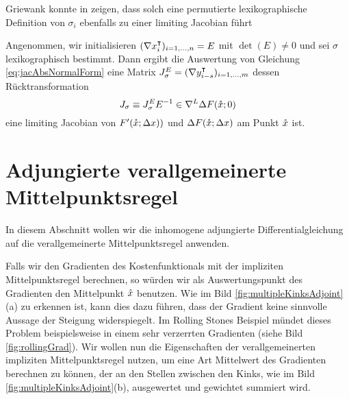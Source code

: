 Griewank konnte in \cite[Prop.8]{monster} zeigen, dass solch eine permutierte lexikographische Definition von $\sigma_i$ ebenfalls zu einer limiting Jacobian führt
\begin{theorem}
Angenommen, wir initialisieren $(\nabla x_i^\intercal)_{i=1,\ldots,n} = E$ mit $\det(E)\neq 0$ und sei $\sigma$ lexikographisch bestimmt. Dann ergibt die Auswertung von Gleichung \eqref{eq:jacAbsNormalForm} eine Matrix $J_\sigma^E = (\nabla y_{i-s}^\intercal)_{i=1,\ldots,m}$ dessen Rücktransformation
\[
 J_\sigma \equiv J_\sigma^E E^{-1} \in \nabla^L \Delta F(\mathring{x};0) 
\]
eine limiting Jacobian von $F'(\mathring{x};\Delta x))$ und $\Delta F(\mathring{x};\Delta x)$ am Punkt $\mathring{x}$ ist.
\end{theorem}
\section{Adjungierte verallgemeinerte Mittelpunktsregel}

In diesem Abschnitt wollen wir die inhomogene adjungierte Differentialgleichung auf die verallgemeinerte Mittelpunktsregel anwenden.

Falls wir den Gradienten des Kostenfunktionals mit der impliziten Mittelpunktsregel berechnen, so würden wir als Auswertungspunkt des Gradienten den Mittelpunkt $\mathring{x}$ benutzen. Wie im Bild \ref{fig:multipleKinksAdjoint}(a) zu erkennen ist, kann dies dazu führen, dass der Gradient keine sinnvolle Aussage der Steigung widerspiegelt. Im Rolling Stones Beispiel mündet dieses Problem beispielsweise in einem sehr verzerrten Gradienten (siehe Bild \ref{fig:rollingGrad}). Wir wollen nun die Eigenschaften der verallgemeinerten impliziten Mittelpunktsregel nutzen, um eine Art Mittelwert des Gradienten berechnen zu können, der an den Stellen zwischen den Kinks, wie im Bild \ref{fig:multipleKinksAdjoint}(b), ausgewertet und gewichtet summiert wird. 

